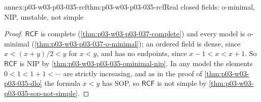 \begin{annexitem}{annex:p03-w03-p03-035-rcf}{thm:p03-w03-p03-035-rcf}{Real closed fields: o-minimal, NIP, unstable, not simple}
\begin{proof}
\(\mathsf{RCF}\) is complete (\cref{thm:p03-w03-p03-037-complete}) and every
model is o-minimal (\cref{thm:p03-w03-p03-037-o-minimal}); an ordered field is
dense, since \(x<(x+y)/2<y\) for \(x<y\), and has no endpoints, since
\(x-1<x<x+1\).  So \(\mathsf{RCF}\) is NIP by
\cref{thm:p03-w03-p03-035-ominimal-nip}.  In any model the elements
\(0<1<1+1<\cdots\) are strictly increasing, and as in the proof of
\cref{thm:p03-w03-p03-035-dlo} the formula \(x<y\) has SOP, so
\(\mathsf{RCF}\) is not simple by
\cref{thm:p03-w03-p03-035-sop-not-simple}.
\end{proof}
\end{annexitem}

